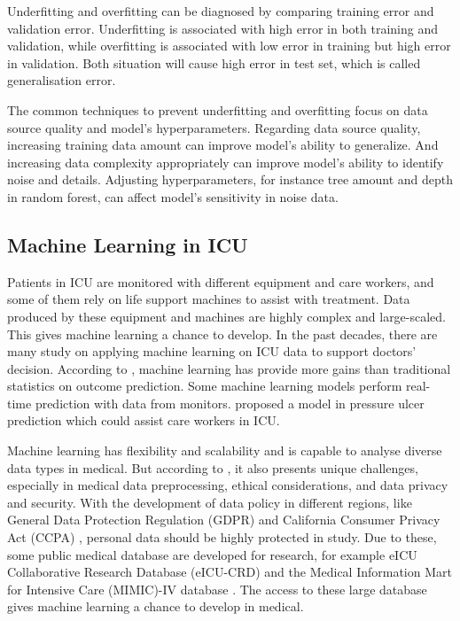 \documentclass[12pt,a4paper,english
]{tunithesis}
\begin{document}
Underfitting and overfitting can be diagnosed by comparing training error and validation error. Underfitting is associated with high error in both training and validation, while overfitting is associated with low error in training but high error in validation. Both situation will cause high error in test set, which is called generalisation error. 

The common techniques to prevent underfitting and overfitting focus on data source quality and model's hyperparameters. Regarding data source quality, increasing training data amount can improve model's ability to generalize. And increasing data complexity appropriately can improve model's ability to identify noise and details. Adjusting hyperparameters, for instance tree amount and depth in random forest, can affect model's sensitivity in noise data. 

\subsection{Machine Learning in ICU}
Patients in ICU are monitored with different equipment and care workers, and some of them rely on life support machines to assist with treatment. Data produced by these equipment and machines are highly complex and large-scaled. This gives machine learning a chance to develop. In the past decades, there are many study on applying machine learning on ICU data to support doctors' decision. According to \textcite{Kim2011}, machine learning has provide more gains than traditional statistics on outcome prediction. Some machine learning models perform real-time prediction with data from monitors. \parencite{mitdavid2020, Zhale2021} \textcite{sin2022} proposed a model in pressure ulcer prediction which could assist care workers in ICU. 

Machine learning has flexibility and scalability and is capable to analyse diverse data types in medical. But according to \textcite{ngiam2019}, it also presents unique challenges, especially in medical data preprocessing, ethical considerations, and data privacy and security. With the development of data policy in different regions, like General Data Protection Regulation (GDPR) \textcite{GDPR2016} and California Consumer Privacy Act (CCPA) \textcite{california2024}, personal data should be highly protected in study. Due to these, some public medical database are developed for research, for example eICU Collaborative Research Database (eICU-CRD) \textcite{Pollard2018} and the Medical Information Mart for Intensive Care (MIMIC)-IV database \textcite{johnson2023}. The access to these large database gives machine learning a chance to develop in medical.
\end{document}

